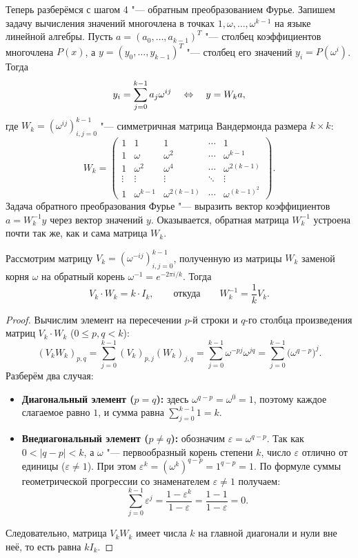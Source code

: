 Теперь разберёмся с шагом 4 "--- обратным преобразованием Фурье. Запишем задачу вычисления значений многочлена в точках $1, \omega, \dots, \omega^{k-1}$ на языке линейной алгебры. Пусть $a = (a_0, \dots, a_{k-1})^T$ "--- столбец коэффициентов многочлена $P(x)$, а $y = (y_0, \dots, y_{k-1})^T$ "--- столбец его значений $y_i = P(\omega^i)$. Тогда
\[
    y_i = \sum_{j=0}^{k-1} a_j \omega^{ij} \quad \Leftrightarrow \quad y = W_k a,
\]
где $W_k = (\omega^{ij})_{i,j=0}^{k-1}$ "--- симметричная матрица Вандермонда размера $k \times k$:
\[
    W_k = \begin{pmatrix}
        1 & 1 & 1 & \cdots & 1 \\
        1 & \omega & \omega^2 & \cdots & \omega^{k-1} \\
        1 & \omega^2 & \omega^4 & \cdots & \omega^{2(k-1)} \\
        \vdots & \vdots & \vdots & \ddots & \vdots \\
        1 & \omega^{k-1} & \omega^{2(k-1)} & \cdots & \omega^{(k-1)^2}
    \end{pmatrix}.
\]
Задача обратного преобразования Фурье "--- выразить вектор коэффициентов $a = W_k^{-1} y$ через вектор значений $y$. Оказывается, обратная матрица $W_k^{-1}$ устроена почти так же, как и сама матрица $W_k$.

\begin{theorem}\label{thm:ifft_matrix}
    Рассмотрим матрицу $V_k = (\omega^{-ij})_{i,j=0}^{k-1}$, полученную из матрицы $W_k$ заменой корня $\omega$ на обратный корень $\omega^{-1} = e^{-2\pi i / k}$. Тогда
    \[
        V_k \cdot W_k = k \cdot I_k, \qquad \text{откуда} \qquad W_k^{-1} = \frac{1}{k} V_k.
    \]
\end{theorem}

\begin{proof}
    Вычислим элемент на пересечении $p$-й строки и $q$-го столбца произведения матриц $V_k \cdot W_k$ ($0 \le p, q < k$):
    \[
        (V_k W_k)_{p, q} = \sum_{j=0}^{k-1} (V_k)_{p, j} (W_k)_{j, q} = \sum_{j=0}^{k-1} \omega^{-pj} \omega^{jq} = \sum_{j=0}^{k-1} \bigl(\omega^{q - p}\bigr)^j.
    \]
    Разберём два случая:
    \begin{itemize}
        \item \textbf{Диагональный элемент ($p = q$):} здесь $\omega^{q - p} = \omega^0 = 1$, поэтому каждое слагаемое равно $1$, и сумма равна $\sum_{j=0}^{k-1} 1 = k$.
        \item \textbf{Внедиагональный элемент ($p \ne q$):} обозначим $\varepsilon = \omega^{q - p}$. Так как $0 < |q - p| < k$, а $\omega$ "--- первообразный корень степени $k$, число $\varepsilon$ отлично от единицы ($\varepsilon \ne 1$). При этом $\varepsilon^k = (\omega^k)^{q - p} = 1^{q - p} = 1$. По формуле суммы геометрической прогрессии со знаменателем $\varepsilon \ne 1$ получаем:
        \[
            \sum_{j=0}^{k-1} \varepsilon^j = \frac{1 - \varepsilon^k}{1 - \varepsilon} = \frac{1 - 1}{1 - \varepsilon} = 0.
        \]
    \end{itemize}
    Следовательно, матрица $V_k W_k$ имеет числа $k$ на главной диагонали и нули вне неё, то есть равна $k I_k$.
\end{proof}

